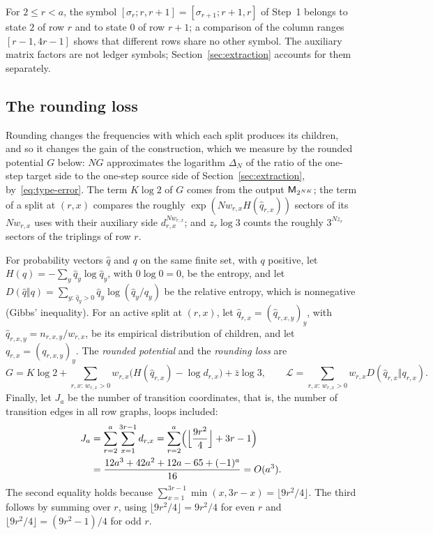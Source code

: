For \(2\le r<a\), the symbol \([\sigma_r;r,r+1]=[\sigma_{r+1};r+1,r]\) of
Step~1 belongs to state \(2\) of row \(r\) and to state \(0\) of row
\(r+1\); a comparison of
the column ranges \([r-1,4r-1]\) shows that different rows share no other
symbol. The auxiliary matrix factors are not ledger symbols;
Section~\ref{sec:extraction} accounts for them separately.

\subsection{The rounding loss}
\label{subsec:entropy-loss}

Rounding changes the frequencies with which each split produces its
children, and so it changes the gain of the construction, which we measure
by the rounded potential \(G\) below: \(NG\) approximates the logarithm
\(\Delta_N\) of the ratio of the one-step target side to the one-step source
side of Section~\ref{sec:extraction}, by~\eqref{eq:type-error}. The term
\(K\log2\) of \(G\) comes from the output \(\mathsf M_{2^{NK}}\); the term of a
split at \((r,x)\) compares the roughly \(\exp(Nw_{r,x}H(\hat q_{r,x}))\)
sectors of its \(Nw_{r,x}\) uses with their auxiliary side
\(d_{r,x}^{Nw_{r,x}}\); and \(z_r\log3\) counts the roughly \(3^{Nz_r}\)
sectors of the triplings of row \(r\).

For probability vectors \(\hat q\) and \(q\) on
the same finite set, with \(q\) positive, let
\(H(\hat q)=-\sum_y\hat q_y\log\hat q_y\), with \(0\log0=0\), be the
entropy, and let
\(D(\hat q\Vert q)=\sum_{y:\,\hat q_y>0}\hat q_y\log(\hat q_y/q_y)\) be the
relative entropy, which is nonnegative (Gibbs' inequality). For an active
split at \((r,x)\), let \(\hat q_{r,x}=(\hat q_{r,x,y})_y\), with
\(\hat q_{r,x,y}=n_{r,x,y}/w_{r,x}\), be its empirical distribution of
children, and let \(q_{r,x}=(q_{r,x,y})_y\). The \emph{rounded potential}
and the \emph{rounding loss} are
\begin{equation}\label{eq:rounded-gain}
 G=K\log2+\sum_{r,x:\,w_{r,x}>0}
   w_{r,x}\bigl(H(\hat q_{r,x})-\log d_{r,x}\bigr)+\bar z\log3,
 \qquad
 \mathcal L=\sum_{r,x:\,w_{r,x}>0}w_{r,x}D(\hat q_{r,x}\Vert q_{r,x}).
\end{equation}
Finally, let \(J_a\) be the number of transition coordinates, that is, the
number of transition edges in all row graphs, loops included:
\begin{equation}\label{eq:coordinate-count}
 \begin{split}
 J_a&=\sum_{r=2}^a\sum_{x=1}^{3r-1}d_{r,x}
     =\sum_{r=2}^a\Bigl(\Bigl\lfloor\frac{9r^2}{4}\Bigr\rfloor+3r-1\Bigr)\\
    &=\frac{12a^3+42a^2+12a-65+(-1)^a}{16}=O(a^3).
 \end{split}
\end{equation}
The second equality holds because
\(\sum_{x=1}^{3r-1}\min(x,3r-x)=\lfloor9r^2/4\rfloor\). The third follows by
summing over \(r\), using \(\lfloor9r^2/4\rfloor=9r^2/4\) for even \(r\) and
\(\lfloor9r^2/4\rfloor=(9r^2-1)/4\) for odd \(r\).

